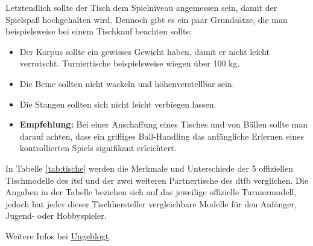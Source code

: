 Letztendlich sollte der Tisch dem Spielniveau angemessen sein, damit der Spielspaß hochgehalten wird. Dennoch gibt es ein paar Grundsätze, die man beispielsweise bei einem Tischkauf beachten sollte:
\begin{itemize}
\item Der Korpus sollte ein gewisses Gewicht haben, damit er nicht leicht verrutscht. Turniertische beispielsweise wiegen über 100 kg.
\item Die Beine sollten nicht wackeln und höhenverstellbar sein.
\item Die Stangen sollten sich nicht leicht verbiegen lassen.
\item {\normalfont \bfseries Empfehlung:} Bei einer Anschaffung eines Tisches und von Bällen sollte man darauf achten, dass ein griffiges Ball-Handling das anfängliche Erlernen eines kontrollierten Spiels signifikant erleichtert.
\end{itemize}

In Tabelle \ref{tab:tische} werden die Merkmale und Unterschiede der 5 offiziellen Tischmodelle des \gls{itsf} und der zwei weiteren Partnertische des \gls{dtfb} verglichen. 
Die Angaben in der Tabelle beziehen sich auf das jeweilige offizielle Turniermodell, jedoch hat jeder dieser Tischhersteller vergleichbare Modelle für den Anfänger, Jugend- oder Hobbyspieler.    

Weitere Infos bei \href{http://ungeblogtkickern.blogspot.de/2015/06/inhaltsverzeichnis.html}{Ungeblogt}.

